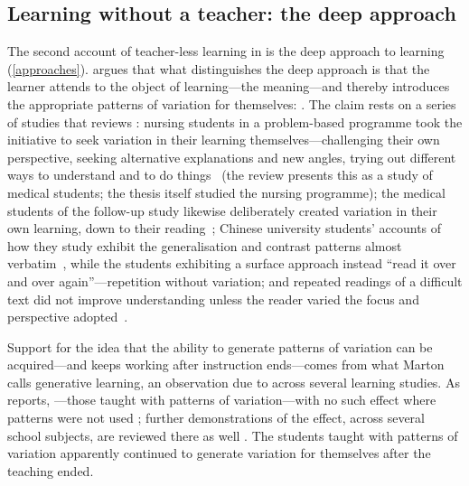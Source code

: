 \subsection{Learning without a teacher: the deep approach}

The second account of teacher-less learning in  is the deep
approach to learning (\cref{approaches}).
 argues that what distinguishes the deep approach is that the
learner attends to the object of learning---the meaning---and thereby
introduces the appropriate patterns of variation for themselves:
.
The claim rests on a series of studies that \citeauthor{NCOL} reviews
\autocite[pp.~142--151]{NCOL}: nursing students in a problem-based
programme took the initiative to seek variation in their learning
themselves---challenging their own perspective, seeking alternative
explanations and new angles, trying out different ways to understand
and to do things~\autocite[p.~265]{Silen2000} (the review presents
this as a study of medical students; the thesis itself studied the
nursing programme); the medical students of the follow-up study
likewise deliberately created variation in their own learning, down
to their reading~\autocite{FyreniusWirellSilen2007}; Chinese university
students' accounts of how they study exhibit the generalisation and contrast
patterns almost verbatim~\autocite{MartonWenWong2005}, while the students
exhibiting a surface approach instead \enquote{read it over and over again}---repetition without variation; and repeated readings of a difficult text
did not improve understanding unless the reader varied the focus and
perspective adopted~\autocite{MartonWenestam1988}.

Support for the idea that the ability to generate patterns of variation can be
acquired---and keeps working after instruction ends---comes from what
Marton calls generative learning, an observation due to
\textcite{HolmqvistGustavssonWernberg2007} across several learning studies.
As \citeauthor{NCOL} reports, ---those taught with patterns of
variation---with no such effect where patterns were not used
\autocite[pp.~227--228]{NCOL}; further demonstrations of the effect, across
several school subjects, are reviewed there as well
\autocite[p.~228]{NCOL}.
The students taught with patterns of variation apparently continued to
generate variation for themselves after the teaching ended.

